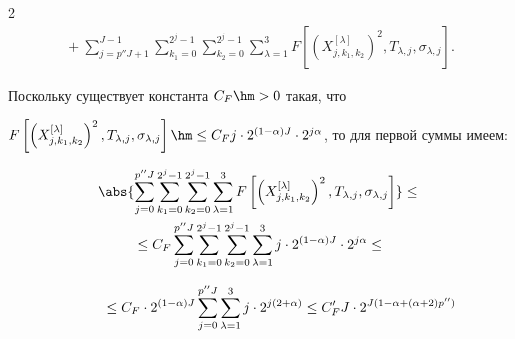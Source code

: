 \begin{multicols}{2}
\begin{multline*}
{}+


 \sum\limits_{j=p''J+1}^{J-1} \sum\limits_{k_1=0}^{2^j-1}


 \sum\limits_{k_2=0}^{2^j-1} \sum\limits_{\lambda=1}^3


 F\left[\left(X_{j,k_1,k_2}^{[\lambda]}\right)^2,T_{\lambda,j},\sigma_{\lambda,j}\right].


\end{multline*}


%


Поскольку существует константа $C_F \hm> 0$ такая, что


$F\left[\left(X_{j,k_1,k_2}^{[\lambda]}\right)^2,T_{\lambda,j},\sigma_{\lambda,j}\right] \hm


\leq C_F  j \cdot2^{(1-\alpha)J}\cdot2^{j\alpha}$, то для первой суммы имеем:





\noindent


\begin{multline*}


\abs{\sum_{j=0}^{p''J} \sum_{k_1=0}^{2^j-1}\sum_{k_2=0}^{2^j-1}


\sum_{\lambda=1}^3 F\left[\left(X_{j,k_1,k_2}^{[\lambda]}\right)^2,T_{\lambda,j},


\sigma_{\lambda,j}\right]}


\leq {}\\


{}\leq C_F\sum_{j=0}^{p''J}


\sum_{k_1=0}^{2^j-1}


\sum_{k_2=0}^{2^j-1}


\sum_{\lambda=1}^3 j \cdot2^{(1-\alpha)J}\cdot2^{j\alpha} \leq{}


\end{multline*}





\end{multicols}











\noindent


\begin{equation}


\label{Large_Coeff_Order}


\hspace*{10mm}{}\leq C_F\cdot 2^{(1-\alpha)J}


\sum_{j=0}^{p''J}


\sum_{\lambda=1}^3 j\cdot 2^{j(2+\alpha)}


\leq C'_F  J\cdot 2^{J(1 - \alpha + (\alpha + 2) p'')}


\end{equation}


